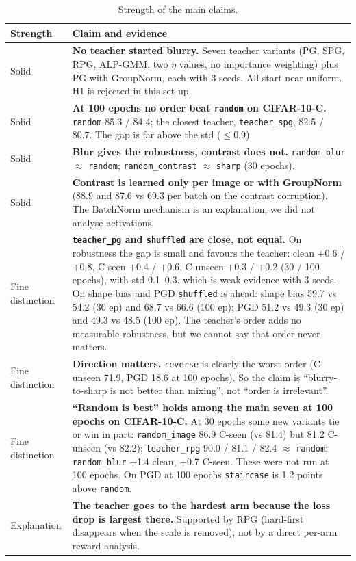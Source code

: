 \documentclass[a4paper,12pt]{report}
\newcommand{\cond}[1]{\texttt{#1}}
\begin{document}
\begin{table}[htbp]
\caption{Strength of the main claims.}
\label{tab:sure}
\begin{center}
\footnotesize
\begin{tabular}{|P{2.1cm}|P{12.2cm}|} \hline
\textbf{Strength} & \textbf{Claim and evidence} \\ \hline
Solid & \textbf{No teacher started blurry.} Seven teacher variants (PG, SPG, RPG, ALP-GMM, two $\eta$ values, no importance weighting) plus PG with GroupNorm, each with 3 seeds. All start near uniform. H1 is rejected in this set-up. \\ \hline
Solid & \textbf{At 100 epochs no order beat \cond{random} on CIFAR-10-C.} \cond{random} 85.3 / 84.4; the closest teacher, \cond{teacher\_spg}, 82.5 / 80.7. The gap is far above the std ($\le$0.9). \\ \hline
Solid & \textbf{Blur gives the robustness, contrast does not.} \cond{random\_blur} $\approx$ \cond{random}; \cond{random\_contrast} $\approx$ \cond{sharp} (30 epochs). \\ \hline
Solid & \textbf{Contrast is learned only per image or with GroupNorm} (88.9 and 87.6 vs 69.3 per batch on the contrast corruption). The BatchNorm mechanism is an explanation; we did not analyse activations. \\ \hline
Fine distinction & \textbf{\cond{teacher\_pg} and \cond{shuffled} are close, not equal.} On robustness the gap is small and favours the teacher: clean +0.6 / +0.8, C-seen +0.4 / +0.6, C-unseen +0.3 / +0.2 (30 / 100 epochs), with std 0.1--0.3, which is weak evidence with 3 seeds. On shape bias and PGD \cond{shuffled} is ahead: shape bias 59.7 vs 54.2 (30 ep) and 68.7 vs 66.6 (100 ep); PGD 51.2 vs 49.3 (30 ep) and 49.3 vs 48.5 (100 ep). The teacher's order adds no measurable robustness, but we cannot say that order never matters. \\ \hline
Fine distinction & \textbf{Direction matters.} \cond{reverse} is clearly the worst order (C-unseen 71.9, PGD 18.6 at 100 epochs). So the claim is ``blurry-to-sharp is not better than mixing'', not ``order is irrelevant''. \\ \hline
Fine distinction & \textbf{``Random is best'' holds among the main seven at 100 epochs on CIFAR-10-C.} At 30 epochs some new variants tie or win in part: \cond{random\_image} 86.9 C-seen (vs 81.4) but 81.2 C-unseen (vs 82.2); \cond{teacher\_rpg} 90.0 / 81.1 / 82.4 $\approx$ \cond{random}; \cond{random\_blur} +1.4 clean, +0.7 C-seen. These were not run at 100 epochs. On PGD at 100 epochs \cond{staircase} is 1.2 points above \cond{random}. \\ \hline
Explanation & \textbf{The teacher goes to the hardest arm because the loss drop is largest there.} Supported by RPG (hard-first disappears when the scale is removed), not by a direct per-arm reward analysis. \\ \hline
\end{tabular}
\end{center}
\end{table}
\end{document}
